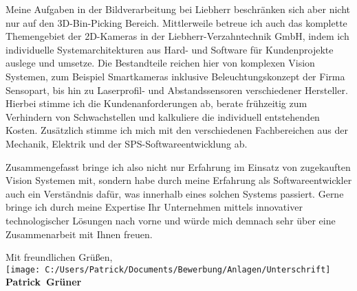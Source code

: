 \documentclass[10pt,a4paper]{article}
\def\firstname{Patrick}
\def\familyname{Grüner}
\begin{document}
Meine Aufgaben in der Bildverarbeitung bei Liebherr beschränken sich aber nicht nur auf den 3D-Bin-Picking Bereich. Mittlerweile betreue ich auch das komplette Themengebiet der 2D-Kameras in der Liebherr-Verzahntechnik GmbH, indem ich individuelle Systemarchitekturen aus Hard- und Software für Kundenprojekte auslege und umsetze. Die Bestandteile reichen hier von komplexen Vision Systemen, zum Beispiel Smartkameras inklusive Beleuchtungskonzept der Firma Sensopart, bis hin zu Laserprofil- und Abstandssensoren verschiedener Hersteller. Hierbei stimme ich die Kundenanforderungen ab, berate frühzeitig zum Verhindern von Schwachstellen und kalkuliere die individuell entstehenden Kosten. Zusätzlich stimme ich mich mit den verschiedenen Fachbereichen aus der Mechanik, Elektrik und der SPS-Softwareentwicklung ab.

Zusammengefasst bringe ich also nicht nur Erfahrung im Einsatz von zugekauften Vision Systemen mit, sondern habe durch meine Erfahrung als Softwareentwickler auch ein Verständnis dafür, was innerhalb eines solchen Systems passiert. Gerne bringe ich durch meine Expertise Ihr Unternehmen mittels innovativer technologischer Lösungen nach vorne und würde mich demnach sehr über eine Zusammenarbeit mit Ihnen freuen.

Mit freundlichen Grüßen,\\[3em]

\texttt{[image: C:/Users/Patrick/Documents/Bewerbung/Anlagen/Unterschrift]}\\
{\bfseries \firstname~\familyname}\\
%
\vfill%
\end{document}
